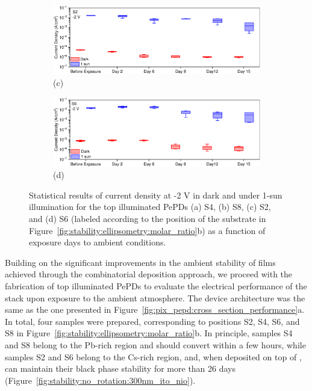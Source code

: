\begin{figure}[ht!]
    \begin{subfigure}[t]{0.99\textwidth}
        \centering
        \includegraphics[width=\textwidth]{chapters/stability/imeges/AP44_2_Thesis.pdf} %
        \caption*{(c)}
    \end{subfigure}
    \hfill
    \begin{subfigure}[t]{0.99\textwidth}
        \centering
        \includegraphics[width=\textwidth]{chapters/stability/imeges/AP44_4_Thesis.pdf} %
        \caption*{(d)}
    \end{subfigure}
    \caption{Statistical results of current density at -2 V in dark and under 1-sun illumination for the top illuminated PePDs (a) S4, (b) S8, (c) S2, and (d) S6 (labeled according to the position of the substrate in Figure~\ref{fig:stability:ellipsometry:molar_ratio}b) as a function of exposure days to ambient conditions.}
    \label{fig:stability:pepd_stability}
\end{figure}


Building on the significant improvements in the ambient stability of  films achieved through the combinatorial deposition approach, we proceed with the fabrication of top illuminated PePDs to evaluate the electrical performance of the stack upon exposure to the ambient atmosphere. The device architecture was the same as the one presented in Figure~\ref{fig:pix_pepd:cross_section_performance}a. In total, four samples were prepared, corresponding to positions S2, S4, S6, and S8 in Figure~\ref{fig:stability:ellipsometry:molar_ratio}b. In principle, samples S4 and S8 belong to the Pb-rich region and should convert within a few hours, while samples S2 and S6 belong to the Cs-rich region, and, when deposited on top of , can maintain their black phase stability for more than 26 days (Figure~\ref{fig:stability:no_rotation:300nm_ito_nio}). 

